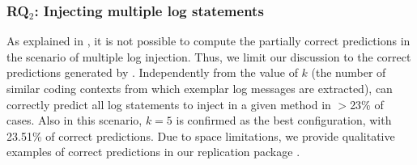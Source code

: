 

\subsubsection{RQ$_{2}$: Injecting multiple log statements}
\label{sec:rq2}
As explained in , it is not possible to compute the partially correct predictions in the scenario of multiple log injection. Thus, we limit our discussion to the correct predictions generated by \approach. Independently from the value of $k$ (\ie the number of similar coding contexts from which exemplar log messages are extracted), \approach can correctly predict all log statements to inject in a given method in $>$23\% of cases. Also in this scenario, $k=5$ is confirmed as the best configuration, with 23.51\% of correct predictions. Due to space limitations, we provide qualitative examples of correct predictions in our replication package \cite{replication}. 


